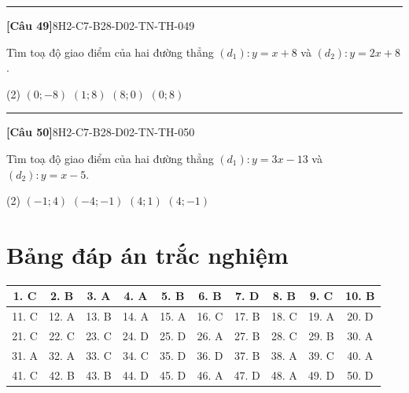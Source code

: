 \documentclass[12pt,a4paper]{article}
\newif\ifloigiai
\newenvironment{cauhoi}[2]{%
  \par\medskip\noindent\rule{\textwidth}{0.4pt}\par\nopagebreak
  \noindent\textbf{[#1]}\hfill{\scriptsize\ttfamily #2}\par\nopagebreak\smallskip}{\par}
\newcommand{\dapan}[1]{\ifloigiai\par\smallskip\noindent\textit{Đáp án:} \textbf{#1}\par\fi}
\begin{document}
\begin{cauhoi}{Câu 49}{8H2-C7-B28-D02-TN-TH-049}
Tìm toạ độ giao điểm của hai đường thẳng $(d_1): y=x+8$ và $(d_2): y=2x+8$.
\begin{tasks}(2)
\task $(0;-8)$
\task $(1;8)$
\task $(8;0)$
\task $(0;8)$
\end{tasks}
\dapan{D}
\end{cauhoi}
\begin{cauhoi}{Câu 50}{8H2-C7-B28-D02-TN-TH-050}
Tìm toạ độ giao điểm của hai đường thẳng $(d_1): y=3x-13$ và $(d_2): y=x-5$.
\begin{tasks}(2)
\task $(-1;4)$
\task $(-4;-1)$
\task $(4;1)$
\task $(4;-1)$
\end{tasks}
\dapan{D}
\end{cauhoi}
\clearpage\section*{Bảng đáp án trắc nghiệm}
\begin{center}\begin{tabular}{|c|c|c|c|c|c|c|c|c|c|}
\hline
1. C & 2. B & 3. A & 4. A & 5. B & 6. B & 7. D & 8. B & 9. C & 10. B\\\hline
11. C & 12. A & 13. B & 14. A & 15. A & 16. C & 17. B & 18. C & 19. A & 20. D\\\hline
21. C & 22. C & 23. C & 24. D & 25. D & 26. A & 27. B & 28. C & 29. B & 30. A\\\hline
31. A & 32. A & 33. C & 34. C & 35. D & 36. D & 37. B & 38. A & 39. C & 40. A\\\hline
41. C & 42. B & 43. B & 44. D & 45. D & 46. A & 47. D & 48. A & 49. D & 50. D\\\hline
\end{tabular}\end{center}
\end{document}

